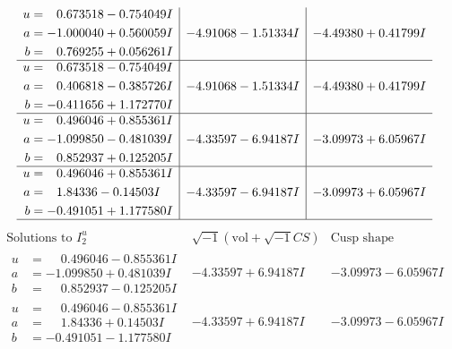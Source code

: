 \documentclass[1p]{elsarticle_modified}
\theoremstyle{definition}
\newcommand{\I}{\sqrt{-1}}
\begin{document}
$$\begin{array}{c|c|c}
\begin{aligned}
u &= \phantom{-}0.673518 - 0.754049 I \\
a &= -1.000040 + 0.560059 I \\
b &= \phantom{-}0.769255 + 0.056261 I\end{aligned}
 & -4.91068 - 1.51334 I & -4.49380 + 0.41799 I \\ \hline\begin{aligned}
u &= \phantom{-}0.673518 - 0.754049 I \\
a &= \phantom{-}0.406818 - 0.385726 I \\
b &= -0.411656 + 1.172770 I\end{aligned}
 & -4.91068 - 1.51334 I & -4.49380 + 0.41799 I \\ \hline\begin{aligned}
u &= \phantom{-}0.496046 + 0.855361 I \\
a &= -1.099850 - 0.481039 I \\
b &= \phantom{-}0.852937 + 0.125205 I\end{aligned}
 & -4.33597 - 6.94187 I & -3.09973 + 6.05967 I \\ \hline\begin{aligned}
u &= \phantom{-}0.496046 + 0.855361 I \\
a &= \phantom{-}1.84336 - 0.14503 I \\
b &= -0.491051 + 1.177580 I\end{aligned}
 & -4.33597 - 6.94187 I & -3.09973 + 6.05967 I\\
 \hline 
 \end{array}$$\newpage$$\begin{array}{c|c|c}  
\text{Solutions to }I^u_{2}& \I (\text{vol} + \sqrt{-1}CS) & \text{Cusp shape}\\
 \hline 
\begin{aligned}
u &= \phantom{-}0.496046 - 0.855361 I \\
a &= -1.099850 + 0.481039 I \\
b &= \phantom{-}0.852937 - 0.125205 I\end{aligned}
 & -4.33597 + 6.94187 I & -3.09973 - 6.05967 I \\ \hline\begin{aligned}
u &= \phantom{-}0.496046 - 0.855361 I \\
a &= \phantom{-}1.84336 + 0.14503 I \\
b &= -0.491051 - 1.177580 I\end{aligned}
 & -4.33597 + 6.94187 I & -3.09973 - 6.05967 I \\ \hline\begin{aligned}

\end{aligned}
\end{array}$$
\end{document}

